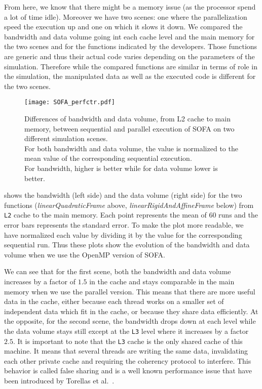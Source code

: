 From here, we know that there might be a memory issue (as the processor spend a lot of time idle).
Moreover we have two scenes: one where the parallelization speed the execution up and one on which it slows it down.
We compared the bandwidth and data volume going int each cache level and the main memory for the two scenes and for the functions indicated by the developers.
Those functions are generic and thus their actual code varies depending on the parameters of the simulation.
Therefore while the compared functions are similar in terms of role in the simulation, the manipulated data as well as the executed code is different for the two scenes.

\begin{figure}[htb]
    \centering
    \texttt{[image: SOFA\_perfctr.pdf]}
    \caption[SOFA likwid results.]{Differences of bandwidth and data volume, from L2 cache to main memory, between sequential and parallel execution of \gls{SOFA} on two different simulation scenes.
        \\
        For both bandwidth and data volume, the value is normalized to the mean value of the corresponding sequential execution.
        \\
        For bandwidth, higher is better while for data volume lower is better.
    }
    \label{fig:SOFA-perfctr}
\end{figure}

 shows the bandwidth (left side) and the data volume (right side) for the two functions (\emph{linearQuadraticFrame} above, \emph{linearRigidAndAffineFrame} below) from \texttt{L2} cache to the main memory.
Each point represents the mean of $60$ runs and the error bars represents the standard error.
To make the plot more readable, we have normalized each value by dividing it by the value for the corresponding sequential run.
Thus these plots show the evolution of the bandwidth and data volume when we use the \gls{OpenMP} version of \gls{SOFA}.

We can see that for the first scene, both the bandwidth and data volume increases by a factor of $1.5$ in the cache and stays comparable in the main memory when we use the parallel version.
This means that there are more useful data in the cache, either because each thread works on a smaller set of independent data which fit in the cache, or because they share data efficiently.
At the opposite, for the second scene, the bandwidth drops down at each level while the data volume stays still except at the \texttt{L3} level where it increases by a factor $2.5$.
It is important to note that the \texttt{L3} cache is the only shared cache of this machine.
It means that several threads are writing the same data, invalidating each other private cache and requiring the coherency protocol to interfere.
This behavior is called false sharing and is a well known performance issue that have been introduced by Torellas et al.~\cite{Torrellas94False}.

